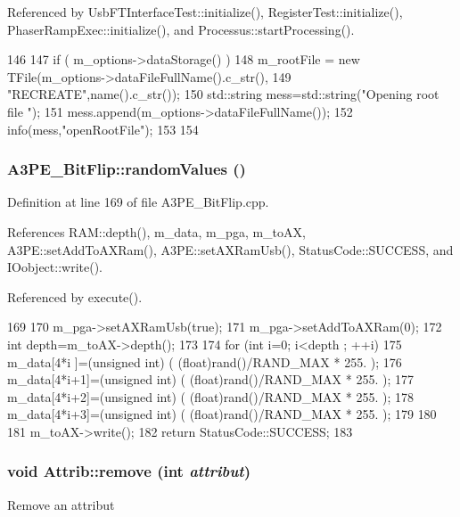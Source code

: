 Referenced by UsbFTInterfaceTest::initialize(), RegisterTest::initialize(), PhaserRampExec::initialize(), and Processus::startProcessing().


\begin{DoxyCode}
146                                {
147   if ( m_options->dataStorage() ){
148     m_rootFile = new TFile(m_options->dataFileFullName().c_str(),
149                            "RECREATE",name().c_str());
150         std::string mess=std::string("Opening root file ");
151         mess.append(m_options->dataFileFullName());
152         info(mess,"openRootFile");
153   }
154 }
\end{DoxyCode}
\hypertarget{classA3PE__BitFlip_a57e668f5be18f8bc53f5c105735646bf}{
\subsubsection[{randomValues}]{ A3PE\_\-BitFlip::randomValues ()}}
\label{classA3PE__BitFlip_a57e668f5be18f8bc53f5c105735646bf}


Definition at line 169 of file A3PE\_\-BitFlip.cpp.

References RAM::depth(), m\_\-data, m\_\-pga, m\_\-toAX, A3PE::setAddToAXRam(), A3PE::setAXRamUsb(), StatusCode::SUCCESS, and IOobject::write().

Referenced by execute().


\begin{DoxyCode}
169                                        {
170   m_pga->setAXRamUsb(true);
171   m_pga->setAddToAXRam(0);
172   int depth=m_toAX->depth();
173 
174   for (int i=0; i<depth ; ++i){
175     m_data[4*i  ]=(unsigned int) ( (float)rand()/RAND_MAX * 255. );
176     m_data[4*i+1]=(unsigned int) ( (float)rand()/RAND_MAX * 255. );
177     m_data[4*i+2]=(unsigned int) ( (float)rand()/RAND_MAX * 255. );
178     m_data[4*i+3]=(unsigned int) ( (float)rand()/RAND_MAX * 255. );
179   }
180 
181   m_toAX->write();
182   return StatusCode::SUCCESS;
183 }
\end{DoxyCode}
\hypertarget{classAttrib_a7d4ef7e32d93cb287792b87b857e79f3}{
\subsubsection[{remove}]{\setlength{\rightskip}{0pt plus 5cm}void Attrib::remove (int {\em attribut})}}
\label{classAttrib_a7d4ef7e32d93cb287792b87b857e79f3}
Remove an attribut 

